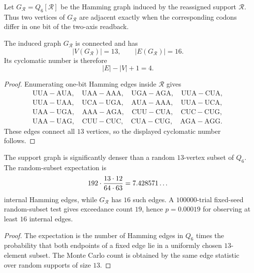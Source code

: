 \begin{definition}
\label{def:philosophy-reassignment-support-graph}
Let $G_{\mathcal{R}}=Q_{6}[\mathcal{R}]$ be the Hamming graph induced
by the reassigned support $\mathcal{R}$. Thus two vertices of
$G_{\mathcal{R}}$ are adjacent exactly when the corresponding codons
differ in one bit of the two-axis readback.
\end{definition}

\begin{theorem}
\label{thm:philosophy-reassignment-support-graph}
The induced graph $G_{\mathcal{R}}$ is connected and has
$$
  |V(G_{\mathcal{R}})|=13,
  \qquad
  |E(G_{\mathcal{R}})|=16.
$$
Its cyclomatic number is therefore
$$
  |E|-|V|+1=4.
$$
\end{theorem}
\begin{proof}
Enumerating one-bit Hamming edges inside $\mathcal{R}$ gives
$$
\begin{gathered}
  \mathrm{UUA}{-}\mathrm{AUA},\quad
  \mathrm{UAA}{-}\mathrm{AAA},\quad
  \mathrm{UGA}{-}\mathrm{AGA},\quad
  \mathrm{UUA}{-}\mathrm{CUA},\\
  \mathrm{UUA}{-}\mathrm{UAA},\quad
  \mathrm{UCA}{-}\mathrm{UGA},\quad
  \mathrm{AUA}{-}\mathrm{AAA},\quad
  \mathrm{UUA}{-}\mathrm{UCA},\\
  \mathrm{UAA}{-}\mathrm{UGA},\quad
  \mathrm{AAA}{-}\mathrm{AGA},\quad
  \mathrm{CUU}{-}\mathrm{CUA},\quad
  \mathrm{CUC}{-}\mathrm{CUG},\\
  \mathrm{UAA}{-}\mathrm{UAG},\quad
  \mathrm{CUU}{-}\mathrm{CUC},\quad
  \mathrm{CUA}{-}\mathrm{CUG},\quad
  \mathrm{AGA}{-}\mathrm{AGG}.
\end{gathered}
$$
These edges connect all $13$ vertices, so the displayed cyclomatic
number follows.
\end{proof}

\begin{corollary}
\label{cor:philosophy-compact-support-graph}
The support graph is significantly denser than a random $13$-vertex
subset of $Q_{6}$. The random-subset expectation is
$$
  192\cdot {13\cdot12\over 64\cdot63}=7.428571\ldots
$$
internal Hamming edges, while $G_{\mathcal{R}}$ has $16$ such edges. A
$100000$-trial fixed-seed random-subset test gives exceedance count
$19$, hence $p=0.00019$ for observing at least $16$ internal edges.
\end{corollary}
\begin{proof}
The expectation is the number of Hamming edges in $Q_{6}$ times the
probability that both endpoints of a fixed edge lie in a uniformly
chosen $13$-element subset. The Monte Carlo count is obtained by the
same edge statistic over random supports of size $13$.
\end{proof}

